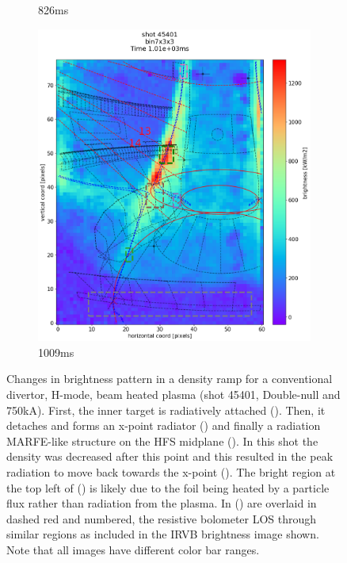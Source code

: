 \begin{figure}
\begin{subfigure}{0.34\linewidth}
         \caption{826ms}
         \label{fig:45401_export_3}
     \end{subfigure}
     \begin{subfigure}{0.36\linewidth}
         \centering
         \includegraphics[trim={50 25 0 80},clip,width=\textwidth]{Chapters/chapter2/figs/IRVB-MASTU_shot-45401_export_66.png}
         \caption{1009ms}
         \label{fig:45401_export_4}
     \end{subfigure}
    \caption{Changes in brightness pattern in a density ramp for a conventional divertor, H-mode, beam heated plasma (shot 45401, Double-null and 750kA). First, the inner target is radiatively attached (). Then, it detaches and forms an x-point radiator () and finally a radiation MARFE-like structure on the HFS midplane (). In this shot the density was decreased after this point and this resulted in the peak radiation to move back towards the x-point (). The bright region at the top left of () is likely due to the foil being heated by a particle flux rather than radiation from the plasma. In () are overlaid in dashed red and numbered, the resistive bolometer LOS through similar regions as included in the IRVB brightness image shown. Note that all images have different color bar ranges.}
    \label{fig:45401_export}
\end{figure}

